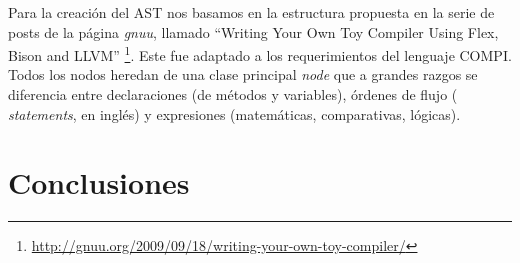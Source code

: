 \documentclass[12pt, a4paper, titlepage]{article}
\begin{document}
  Para la creación del AST nos basamos en la estructura propuesta en la serie de
  posts de la página {\em gnuu}, llamado ``Writing Your Own Toy Compiler Using
  Flex, Bison and LLVM''
  \footnote{\url{http://gnuu.org/2009/09/18/writing-your-own-toy-compiler/}}.
  Este fue adaptado a los requerimientos del lenguaje COMPI. Todos los nodos
  heredan de una clase principal {\em node} que a grandes razgos se diferencia
  entre declaraciones (de métodos y variables), órdenes de flujo ({\em
  statements}, en inglés) y expresiones (matemáticas, comparativas, lógicas).

  \section{Conclusiones}\label{sec:conclusions}
\end{document}
